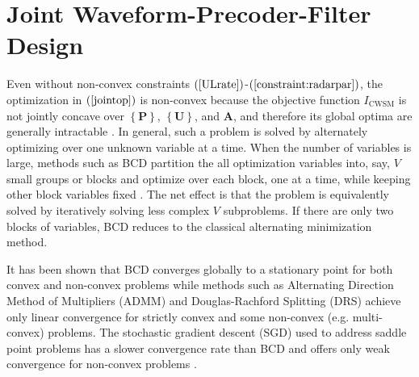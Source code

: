 \documentclass[10pt,journal]{IEEEtran}
\newcommand{\paren}[1]{\left({#1}\right)}
\newcommand{\braces}[1]{{\left\{ {#1}\right\}}}
\theoremstyle{definition}
\begin{document}
\section{Joint Waveform-Precoder-Filter Design}
\label{sec:solution}
Even without non-convex constraints $\paren{\mathrm{\ref{ULrate}}}$-$\paren{\mathrm{\ref{constraint:radarpar}}}$, the optimization in $\paren{\mathrm{\ref{jointop}}}$ is non-convex because the objective function $\mathit{I}_{\textrm{CWSM}}$ is not jointly concave over ${\braces{\mathbf{P}}}$, $\braces{\mathbf{U}}$, and $\mathbf{A}$, and therefore its global optima are generally intractable \cite{Lui2006subg}. In general, such a problem is solved by alternately optimizing over one unknown variable at a time. When the number of variables is large, methods such as BCD partition the all optimization variables into, say, $V$ small groups or blocks and optimize over each block, one at a time, while keeping other block variables fixed \cite{BCDconvergence}. The net effect is that the problem is equivalently solved by iteratively solving less complex $V$ subproblems. %
If there are only two blocks of variables, BCD reduces to the classical alternating minimization method\cite{BCDconvergence,Liu2017asilomar}.  %

It has been shown \cite{ADMMBCD,zhang2017convergent} that BCD converges globally to a stationary point for both convex and non-convex problems while methods such as Alternating Direction Method of Multipliers (ADMM) and Douglas-Rachford Splitting (DRS) achieve only linear convergence for strictly convex and some non-convex (e.g. multi-convex) problems. The stochastic gradient descent (SGD) used to address saddle point problems has a slower convergence rate than BCD and offers only weak convergence for non-convex problems \cite{zhang2017convergent}. 
\end{document}
